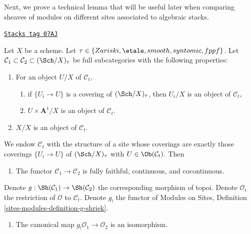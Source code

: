 Next, we prove a technical lemma that will be useful later when comparing
sheaves of modules on different sites associated to algebraic stacks.

\begin{lemma}
\label{etale-cohomology-lemma-compare-structure-sheaves}
\href{https://stacks.math.columbia.edu/tag/07AJ}{\texttt{Stacks tag 07AJ}}

Let $X$ be a scheme. Let
$\tau \in \{Zariski, \etale, smooth, syntomic, fppf\}$.
Let $\mathcal{C}_1 \subset \mathcal{C}_2 \subset (\Sch/X)_\tau$ be full
subcategories with the following properties:
\begin{enumerate}
\item For an object $U/X$ of $\mathcal{C}_t$,
\begin{enumerate}
\item if $\{U_i \to U\}$ is a covering of $(\Sch/X)_\tau$, then
$U_i/X$ is an object of $\mathcal{C}_t$,
\item $U \times \mathbf{A}^1/X$ is an object of $\mathcal{C}_t$.
\end{enumerate}
\item $X/X$ is an object of $\mathcal{C}_t$.
\end{enumerate}
We endow $\mathcal{C}_t$ with the structure of a site whose coverings are
exactly those coverings $\{U_i \to U\}$ of $(\Sch/X)_\tau$ with
$U \in \Ob(\mathcal{C}_t)$. Then
\begin{enumerate}
\item[(a)] The functor $\mathcal{C}_1 \to \mathcal{C}_2$
is fully faithful, continuous, and cocontinuous.
\end{enumerate}
Denote $g : \Sh(\mathcal{C}_1) \to \Sh(\mathcal{C}_2)$ the corresponding
morphism of topoi. Denote $\mathcal{O}_t$ the restriction of $\mathcal{O}$
to $\mathcal{C}_t$. Denote $g_!$ the functor of
Modules on Sites, Definition \ref{sites-modules-definition-g-shriek}.
\begin{enumerate}
\item[(b)] The canonical map $g_!\mathcal{O}_1 \to \mathcal{O}_2$
is an isomorphism.
\end{enumerate}
\end{lemma}

